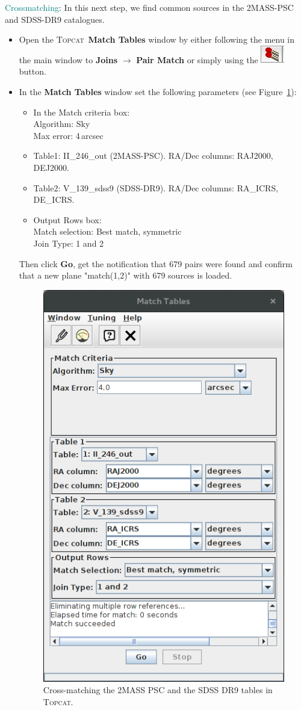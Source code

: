 \documentclass [a4paper, 12pt]{article}
\newcommand{\topcat}{{\textsc{Topcat}}}
\begin{document}
\noindent \textcolor{teal}{Crossmatching}: In this next step, we find common 
sources in the 2MASS-PSC and SDSS-DR9 catalogues. 
\begin{itemize}
    \item Open the \topcat\ \textbf{Match Tables} window by either following 
    the menu in the main window to \textbf{Joins} $\rightarrow$ \textbf{Pair 
    Match} or simply using the \includegraphics[width=0.04 
    \textwidth]{../images/topcat_button_xmatch.jpg} button. 
    \item In the \textbf{Match Tables} window set the following parameters (see 
    Figure~\ref{fig:crossmatch_topcat}):
    \begin{itemize}
        \item In the Match criteria box:\\
        Algorithm: Sky\\
        Max error: 4\,arcsec
        \item Table1: II\_246\_out (2MASS-PSC). RA/Dec columns: RAJ2000,
        DEJ2000.
        \item Table2: V\_139\_sdss9 (SDSS-DR9). RA/Dec columns: RA\_ICRS,
        DE\_ICRS.
        \item Output Rows box:\\
        Match selection: Best match, symmetric\\
        Join Type: 1 and 2
    \end{itemize}
    Then click \textbf{Go}, get the notification that 679 pairs were found and 
    confirm that a new plane "match(1,2)" with 679 sources is loaded.
    \begin{figure}[H]
        \center
        \includegraphics[width=0.4 
        \textwidth]{../images/topcat_match_2MASS_SDSS.png}
        \caption{Cross-matching the 2MASS PSC and the SDSS DR9 tables in 
        \topcat. }
        \label{fig:crossmatch_topcat}
    \end{figure}
\end{itemize}
\end{document}

